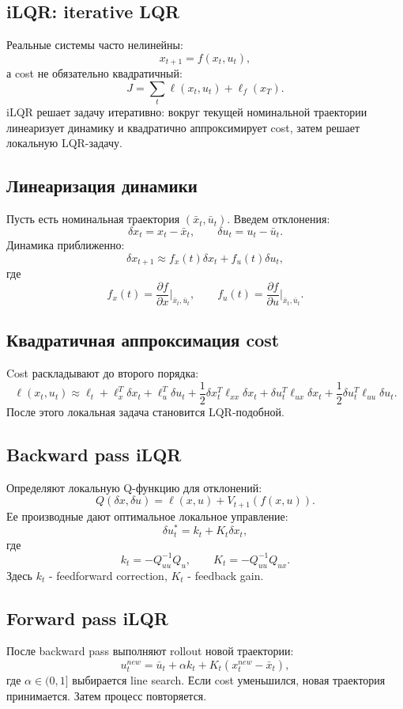 \documentclass[11pt,a4paper]{article}
\newcommand{\1}{\mathbf{1}}
\begin{document}
\subsection*{iLQR: iterative LQR}
Реальные системы часто нелинейны:
\[
    x_{t+1}=f(x_t,u_t),
\]
а cost не обязательно квадратичный:
\[
    J=\sum_t \ell(x_t,u_t)+\ell_f(x_T).
\]
iLQR решает задачу итеративно: вокруг текущей номинальной траектории линеаризует динамику и квадратично аппроксимирует cost, затем решает локальную LQR-задачу.

\subsection*{Линеаризация динамики}
Пусть есть номинальная траектория $(\bar x_t,\bar u_t)$. Введем отклонения:
\[
    \delta x_t=x_t-\bar x_t,
    \qquad
    \delta u_t=u_t-\bar u_t.
\]
Динамика приближенно:
\[
    \delta x_{t+1}\approx f_x(t)\delta x_t+f_u(t)\delta u_t,
\]
где
\[
    f_x(t)=\frac{\partial f}{\partial x}\bigg|_{\bar x_t,\bar u_t},
    \qquad
    f_u(t)=\frac{\partial f}{\partial u}\bigg|_{\bar x_t,\bar u_t}.
\]

\subsection*{Квадратичная аппроксимация cost}
Cost раскладывают до второго порядка:
\[
    \ell(x_t,u_t)\approx \ell_t+
    \ell_x^T\delta x_t+\ell_u^T\delta u_t+
    \frac12\delta x_t^T\ell_{xx}\delta x_t+
    \delta u_t^T\ell_{ux}\delta x_t+
    \frac12\delta u_t^T\ell_{uu}\delta u_t.
\]
После этого локальная задача становится LQR-подобной.

\subsection*{Backward pass iLQR}
Определяют локальную Q-функцию для отклонений:
\[
    Q(\delta x,
    \delta u)=\ell(x,u)+V_{t+1}(f(x,u)).
\]
Ее производные дают оптимальное локальное управление:
\[
    \delta u_t^*=k_t+K_t\delta x_t,
\]
где
\[
    k_t=-Q_{uu}^{-1}Q_u,
    \qquad
    K_t=-Q_{uu}^{-1}Q_{ux}.
\]
Здесь $k_t$ - feedforward correction, $K_t$ - feedback gain.

\subsection*{Forward pass iLQR}
После backward pass выполняют rollout новой траектории:
\[
    u_t^{new}=\bar u_t+\alpha k_t+K_t(x_t^{new}-\bar x_t),
\]
где $\alpha\in(0,1]$ выбирается line search. Если cost уменьшился, новая траектория принимается. Затем процесс повторяется.
\end{document}
